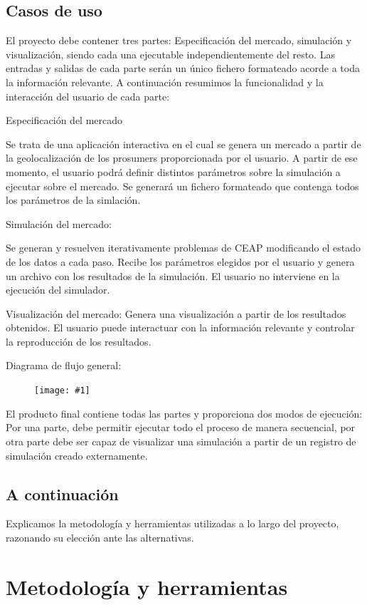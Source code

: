 \documentclass[12pt,a4paper,openright,oneside]{article}
\newcommand{\includeImage}[1]
{
	\begin{figure}[htb]
	\begin{center}
	\texttt{[image: \#1]}
	\end{center}
	\end{figure}
}
\numberwithin{equation}{section}
\theoremstyle{definition}
\begin{document}
\subsection{Casos de uso}

El proyecto debe contener tres partes: Especificación del mercado, simulación y visualización, siendo cada una ejecutable independientemente del resto. Las entradas y salidas de cada parte serán un único fichero formateado acorde a toda la información relevante. A continuación resumimos la funcionalidad y la interacción del usuario de cada parte:

Especificación del mercado

Se trata de una aplicación interactiva en el cual se genera un mercado a partir de la geolocalización de los prosumers proporcionada por el usuario. A partir de ese momento, el usuario podrá definir distintos parámetros sobre la simulación a ejecutar sobre el mercado. Se generará un fichero formateado que contenga todos los parámetros de la simlación.

Simulación del mercado:

Se generan y resuelven iterativamente problemas de CEAP modificando el estado de los datos a cada paso.
Recibe los parámetros elegidos por el usuario y genera un archivo con los resultados de la simulación. El usuario no interviene en la ejecución del simulador.

Visualización del mercado:
Genera una visualización a partir de los resultados obtenidos. El usuario puede interactuar con la información relevante y controlar la reproducción de los resultados. 

Diagrama de flujo general:
\includeImage{flujos_principales.png}

El producto final contiene todas las partes y proporciona dos modos de ejecución: Por una parte, debe permitir ejecutar todo el proceso de manera secuencial, por otra parte debe ser capaz de visualizar una simulación a partir de un registro de simulación creado externamente.


\subsection{A continuación}

Explicamos la metodología y herramientas utilizadas a lo largo del proyecto, razonando su elección ante las alternativas.



\newpage


\section{Metodología y herramientas}
\end{document}
